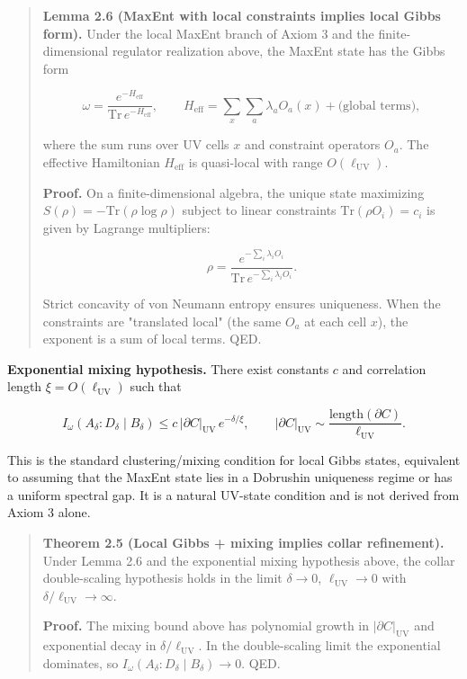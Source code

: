 \begin{quote}
\textbf{Lemma 2.6 (MaxEnt with local constraints implies local Gibbs form).} Under the local MaxEnt branch of Axiom 3 and the finite-dimensional regulator realization above, the MaxEnt state has the Gibbs form

\[
\omega = \frac{e^{-H_{\mathrm{eff}}}}{\mathrm{Tr}\,e^{-H_{\mathrm{eff}}}},
\qquad
H_{\mathrm{eff}} = \sum_x \sum_a \lambda_a O_a(x) + \text{(global terms)},
\]

where the sum runs over UV cells \(x\) and constraint operators \(O_a\). The effective Hamiltonian \(H_{\mathrm{eff}}\) is quasi-local with range \(O(\ell_{\mathrm{UV}})\).

\textbf{Proof.} On a finite-dimensional algebra, the unique state maximizing \(S(\rho) = -\mathrm{Tr}(\rho \log \rho)\) subject to linear constraints \(\mathrm{Tr}(\rho O_i) = c_i\) is given by Lagrange multipliers:

\[
\rho = \frac{e^{-\sum_i \lambda_i O_i}}{\mathrm{Tr}\,e^{-\sum_i \lambda_i O_i}}.
\]

Strict concavity of von Neumann entropy ensures uniqueness. When the constraints are "translated local" (the same \(O_a\) at each cell \(x\)), the exponent is a sum of local terms. QED.
\end{quote}

\textbf{Exponential mixing hypothesis.} There exist constants \(c\) and correlation length \(\xi = O(\ell_{\mathrm{UV}})\) such that

\[
I_\omega(A_\delta:D_\delta \mid B_\delta) \le
c\,\lvert\partial C\rvert_{\mathrm{UV}}\,e^{-\delta/\xi},
\qquad
\lvert\partial C\rvert_{\mathrm{UV}} \sim \frac{\mathrm{length}(\partial C)}{\ell_{\mathrm{UV}}}.
\]

This is the standard clustering/mixing condition for local Gibbs states, equivalent to assuming
that the MaxEnt state lies in a Dobrushin uniqueness regime or has a uniform spectral gap. It is a
natural UV-state condition and is not derived from Axiom 3 alone.

\begin{quote}
\textbf{Theorem 2.5 (Local Gibbs + mixing implies collar refinement).} Under Lemma 2.6 and the exponential mixing hypothesis above, the collar double-scaling hypothesis holds in the limit \(\delta \to 0\), \(\ell_{\mathrm{UV}} \to 0\) with \(\delta/\ell_{\mathrm{UV}} \to \infty\).

\textbf{Proof.} The mixing bound above has polynomial growth in \(\lvert\partial C\rvert_{\mathrm{UV}}\) and exponential decay in \(\delta/\ell_{\mathrm{UV}}\). In the double-scaling limit the exponential dominates, so \(I_\omega(A_\delta:D_\delta \mid B_\delta) \to 0\). QED.
\end{quote}


